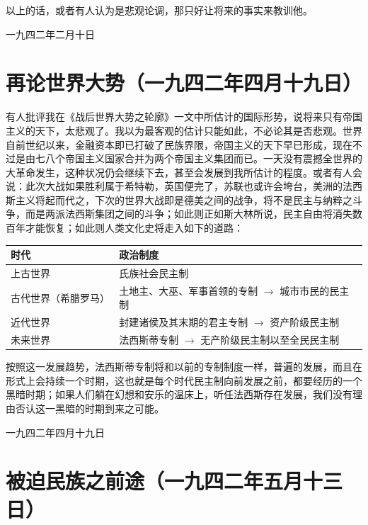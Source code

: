 \documentclass[
  openany,           %
  12pt,              %
  a4paper            %
]{ctexbook}
\begin{document}
以上的话，或者有人认为是悲观论调，那只好让将来的事实来教训他。

\hfill 一九四二年二月十日

\chapter{再论世界大势（一九四二年四月十九日）}

\quad\quad 有人批评我在《战后世界大势之轮廓》一文中所估计的国际形势，说将来只有帝国主义的天下，太悲观了。我以为最客观的估计只能如此，不必论其是否悲观。世界自前世纪以来，金融资本即已打破了民族界限，帝国主义的天下早已形成，现在不过是由七八个帝国主义国家合并为两个帝国主义集团而已。一天没有震撼全世界的大革命发生，这种状况仍会继续下去，甚至会发展到我所估计的程度。或者有人会说：此次大战如果胜利属于希特勒，英国便完了，苏联也或许会垮台，美洲的法西斯主义将起而代之，下次的世界大战即是德美之间的战争，将不是民主与纳粹之斗争，而是两派法西斯集团之间的斗争；如此则正如斯大林所说，民主自由将消失数百年才能恢复；如此则人类文化史将走入如下的道路：

\begin{center}
\small
\begin{tabularx}{\textwidth}{|l|X|}
\hline
\textbf{时代} & \textbf{政治制度} \\
\hline
上古世界 & 氏族社会民主制 \\
\hline
古代世界（希腊罗马） & 土地主、大巫、军事首领的专制 $\rightarrow$ 城市市民的民主制 \\
\hline
近代世界 & 封建诸侯及其末期的君主专制 $\rightarrow$ 资产阶级民主制 \\
\hline
未来世界 & 法西斯蒂专制 $\rightarrow$ 无产阶级民主制以至全民民主制 \\
\hline
\end{tabularx}
\end{center}

按照这一发展趋势，法西斯蒂专制将和以前的专制制度一样，普遍的发展，而且在形式上会持续一个时期，这也就是每个时代民主制向前发展之前，都要经历的一个黑暗时期；如果人们躺在幻想和安乐的温床上，听任法西斯存在发展，我们没有理由否认这一黑暗的时期到来之可能。

\hfill 一九四二年四月十九日

\chapter{被迫民族之前途（一九四二年五月十三日）}
\end{document}
